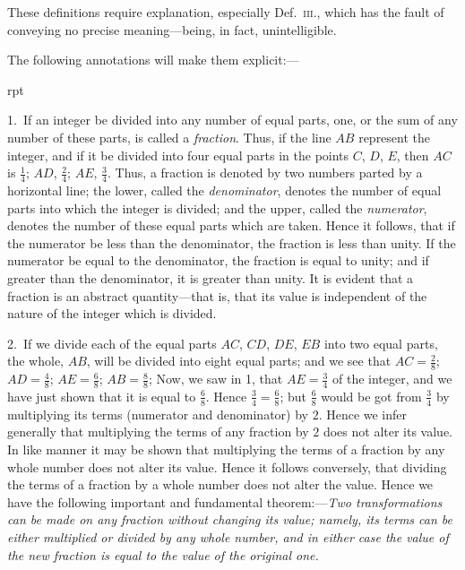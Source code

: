 \documentclass[oneside]{book}
\newcounter{wrapwidth}
\newcommand\imgflow[3]{
\setcounter{wrapwidth}{#1}

\begin{wrapfigure}[#2]{r}{\value{wrapwidth}pt}
\begin{center}
\vspace{-0.3in}

\end{center}
\end{wrapfigure}
}
\begin{document}
These definitions require explanation, especially
Def.~\textsc{iii.}, which has the fault of conveying no precise
meaning---being, in fact, unintelligible.

The following annotations will make them explicit:---\par\smallskip


\imgflow{153}{2}{f256}

\begin{footnotesize}
1.~If an integer be divided into any number of equal parts,
one, or the sum of any number of these parts, is called a \emph{fraction}.
Thus, if the line $AB$ represent
the integer, and if it be divided
into four equal parts in the
points $C$, $D$, $E$, then $AC$ is $\frac{1}{4}$;
$AD$, $\frac{2}{4}$; $AE$, $\frac{3}{4}$. Thus, a fraction is denoted by two numbers
parted by a horizontal line; the lower, called the \emph{denominator},
denotes the number of equal parts into which the integer is divided;
and the upper, called the \emph{numerator}, denotes the number
of these equal parts which are taken. Hence it follows, that if
the numerator be less than the denominator, the fraction is less
than unity. If the numerator be equal to the denominator, the
fraction is equal to unity; and if greater than the denominator, it
is greater than unity. It is evident that a fraction is an abstract
quantity---that is, that its value is independent of the nature of
the integer which is divided.

2.~If we divide each of the equal parts $AC$, $CD$, $DE$, $EB$ into
two equal parts, the whole, $AB$, will be divided into eight equal
parts; and we see that $AC = \frac{2}{8}$; $AD = \frac{4}{8}$; $AE = \frac{6}{8}$; $AB = \frac{8}{8}$;
Now, we saw in 1, that $AE = \frac{3}{4}$ of the integer, and we have just
shown that it is equal to $\frac{6}{8}$. Hence $\frac{3}{4}=\frac{6}{8}$; but $\frac{6}{8}$ would be got
from $\frac{3}{4}$ by multiplying its terms (numerator and denominator)
by $2$. Hence we infer generally that multiplying the terms of
any fraction by $2$ does not alter its value. In like manner it
may be shown that multiplying the terms of a fraction by any
whole number does not alter its value. Hence it follows conversely,
that dividing the terms of a fraction by a whole number
does not alter the value. Hence we have the following important
and fundamental theorem:---\textit{Two transformations can be made on
any fraction without changing its value; namely, its terms can be
either multiplied or divided by any whole number, and in either
case the value of the new fraction is equal to the value of the
original one.}




\end{footnotesize}
\end{document}
